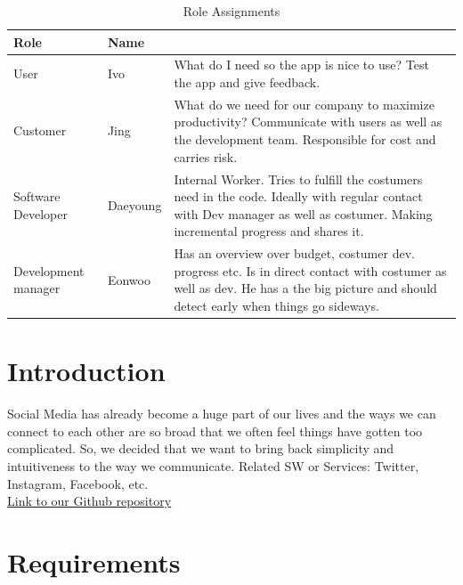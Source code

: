 \documentclass[conference]{IEEEtran}
\numberwithin{figure}{subsection}
\begin{document}
\begin{table}[ht!] \renewcommand\arraystretch{1.25}
  \begin{threeparttable}
      \caption{Role Assignments%
      \label{tab:table1}}    %
      \begin{tabular}{@{}l l>{\raggedright\arraybackslash}p{3.8cm}@{}}
      \toprule
      \bfseries Role & \bfseries Name & \multicolumn{1}{l}{\bfseries Task description and etc.} \\
      \midrule
      User & Ivo & What do I need so the app is nice to use? Test the app and give feedback.\\
      
      Customer & Jing & What do we need for our company to maximize productivity? Communicate with users as well as the development team. Responsible for cost and carries risk.\\
      
      Software Developer & Daeyoung & Internal Worker. Tries to fulfill the costumers need in the code. Ideally with regular contact with Dev manager as well as costumer. Making incremental progress and shares it.\\
      
      Development manager & Eonwoo & Has an overview over budget, costumer dev. progress etc. Is in direct contact with costumer as well as dev. He has a the big picture and should detect early when things go sideways.\\
      \bottomrule
      \end{tabular}
  \end{threeparttable}
\end{table}



\section{Introduction} 
Social Media has already become a huge part of our lives and the ways we can connect to each other are so broad that we often feel things have gotten too complicated. So, we decided that we want to bring back simplicity and intuitiveness to the way we communicate. Related SW or Services: Twitter, Instagram, Facebook, etc. \\

\href{https://github.com/ivovi2/SHOUTING-PINWALL}{Link to our Github repository}

\section{Requirements}
\end{document}

